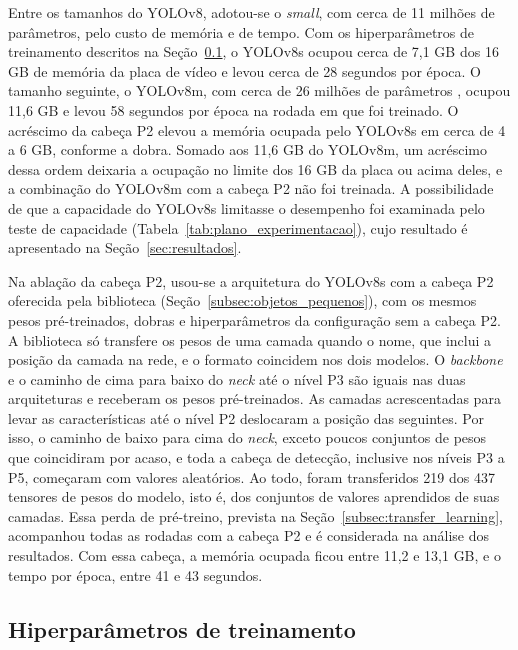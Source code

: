 \documentclass[
    12pt,                %
    openright,           %
    oneside,             %
    a4paper,             %
    english,             %
    brazil               %
]{abntex2}
\begin{document}
Entre os tamanhos do YOLOv8, adotou-se o \textit{small}, com cerca de
11 milhões de parâmetros, pelo custo de memória e de tempo. Com os
hiperparâmetros de treinamento descritos na
Seção~\ref{subsec:hiperparametros}, o YOLOv8s ocupou cerca de 7,1 GB
dos 16 GB de memória da placa de vídeo e levou cerca de 28 segundos por
época. O tamanho seguinte, o YOLOv8m, com cerca de 26 milhões de
parâmetros \cite{Jocher2023}, ocupou 11,6 GB e levou 58 segundos por
época na rodada em que foi treinado. O acréscimo da cabeça P2 elevou
a memória ocupada pelo YOLOv8s em cerca de 4 a 6 GB, conforme a dobra.
Somado aos 11,6 GB do YOLOv8m, um acréscimo dessa ordem deixaria a
ocupação no limite dos 16 GB da placa ou acima deles, e a combinação do
YOLOv8m com a cabeça P2 não foi treinada. A possibilidade de que a capacidade
do YOLOv8s limitasse o desempenho foi examinada pelo teste de
capacidade (Tabela~\ref{tab:plano_experimentacao}), cujo resultado é
apresentado na Seção~\ref{sec:resultados}.

Na ablação da cabeça P2, usou-se a arquitetura do YOLOv8s com a cabeça P2 oferecida
pela biblioteca (Seção~\ref{subsec:objetos_pequenos}), com os mesmos
pesos pré-treinados, dobras e hiperparâmetros da configuração sem a
cabeça P2. A biblioteca só transfere os pesos de uma camada quando o
nome, que inclui a posição da camada na rede, e o formato coincidem nos
dois modelos. O \textit{backbone} e o caminho de cima para baixo do
\textit{neck} até o nível P3 são iguais nas duas arquiteturas e
receberam os pesos pré-treinados. As camadas acrescentadas para levar
as características até o nível P2 deslocaram a posição das seguintes.
Por isso, o caminho de baixo para cima do \textit{neck}, exceto poucos
conjuntos de pesos que coincidiram por acaso, e toda a cabeça de detecção,
inclusive nos níveis P3 a P5, começaram com valores aleatórios. Ao
todo, foram transferidos 219 dos 437 tensores de pesos do modelo, isto
é, dos conjuntos de valores aprendidos de suas camadas. Essa perda de
pré-treino, prevista na Seção~\ref{subsec:transfer_learning},
acompanhou todas as rodadas com a cabeça P2 e é considerada na análise
dos resultados. Com essa cabeça, a memória ocupada ficou entre 11,2 e
13,1 GB, e o tempo por época, entre 41 e 43 segundos.

\subsection{Hiperparâmetros de treinamento}
\label{subsec:hiperparametros}
\end{document}
